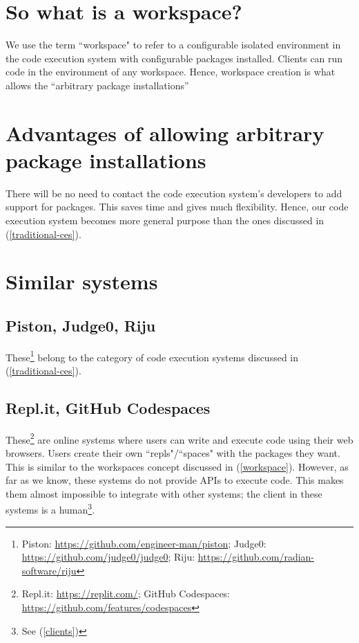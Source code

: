 \documentclass[11pt,a4paper]{article}
\begin{document}
\section{\label{workspace}So what is a workspace?}
We use the term ``workspace" to refer to a configurable isolated environment in the code execution system
with configurable packages installed.
Clients can run code in the environment of any workspace.
Hence, workspace creation is what allows the ``arbitrary package installations''

\section{Advantages of allowing arbitrary package installations}
There will be no need to contact the code execution system's developers to add support for packages.
This saves time and gives much flexibility.
Hence, our code execution system becomes more general purpose than the ones discussed in (\ref{traditional-ces}).

\section{Similar systems}
\subsection{Piston, Judge0, Riju}
These\footnote{
    Piston: \url{https://github.com/engineer-man/piston};
    Judge0: \url{https://github.com/judge0/judge0};
    Riju: \url{https://github.com/radian-software/riju}
}
belong to the category of code execution systems discussed in (\ref{traditional-ces}).

\subsection{Repl.it, GitHub Codespaces}
These\footnote{
    Repl.it: \url{https://replit.com/};
    GitHub Codespaces: \url{https://github.com/features/codespaces}
}
are online systems where users can write and execute code using their web browsers.
Users create their own ``repls"/``spaces" with the packages they want.
This is similar to the workspaces concept discussed in (\ref{workspace}).
However, as far as we know, these systems do not provide APIs to execute code.
This makes them almost impossible to integrate with other systems;
the client in these systems is a human\footnote{See (\ref{clients})}.
\end{document}
